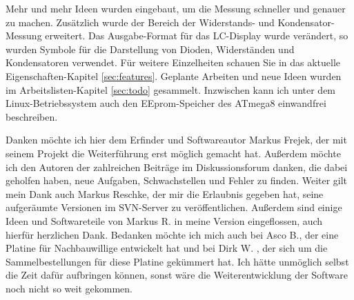 Mehr und mehr Ideen wurden eingebaut, um die Messung schneller und genauer zu machen.
Zusätzlich wurde der Bereich der Widerstands- und Kondensator-Messung erweitert.
Das Ausgabe-Format für das LC-Display wurde verändert, so wurden Symbole für die Darstellung von
Dioden, Widerständen und Kondensatoren verwendet.
Für weitere Einzelheiten schauen Sie in das aktuelle Eigenschaften-Kapitel \ref{sec:features}.
Geplante Arbeiten und neue Ideen wurden im Arbeitslisten-Kapitel \ref{sec:todo} gesammelt.
Inzwischen kann ich unter dem Linux-Betriebssystem auch den EEprom-Speicher des ATmega8 einwandfrei beschreiben.

Danken möchte ich hier dem Erfinder und Softwareautor Markus Frejek, der mit seinem Projekt die Weiterführung erst
möglich gemacht hat.
Außerdem möchte ich den Autoren der zahlreichen Beiträge im Diskussionsforum danken, die dabei geholfen haben, neue Aufgaben, Schwachstellen und
Fehler zu finden. 
Weiter gilt mein Dank auch Markus Reschke, der mir die Erlaubnis gegeben hat, seine aufgeräumte Versionen im
SVN-Server zu veröffentlichen. Außerdem sind einige Ideen und Softwareteile von Markus R. in meine Version eingeflossen,
auch hierfür herzlichen Dank.
Bedanken möchte ich mich auch bei Asco B., der eine Platine für Nachbauwillige entwickelt hat und bei Dirk W. , der sich
um die Sammelbestellungen für diese Platine gekümmert hat. Ich hätte unmöglich selbst die Zeit dafür aufbringen können, sonst
wäre die Weiterentwicklung der Software noch nicht so weit gekommen.

